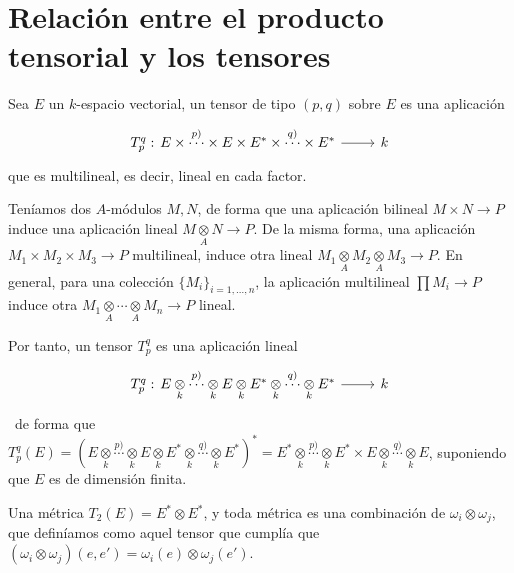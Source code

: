 \section{Relaci\'on entre el producto tensorial y los tensores}
Sea $E$ un $k$-espacio vectorial, un tensor de tipo $(p,q)$ sobre $E$ es una aplicaci\'on
$$\bt T^q_p : &[-10mm] E \times \overset{p)}{\cdots} \times E \times E^* \times \overset{q)}{\cdots} \times E^* \arrow{r} & k\et$$
que es multilineal, es decir, lineal en cada factor.

Ten\'iamos dos $A$-m\'odulos $M,N$, de forma que una aplicaci\'on bilineal $M \times N \longrightarrow P$ induce una aplicaci\'on lineal $M \underset{A}{\otimes} N  \longrightarrow P$. De la misma forma, una aplicaci\'on $M_1\times M_2 \times M_3 \longrightarrow P$ multilineal, induce otra lineal $M_1 \underset{A}{\otimes} M_2 \underset{A}{\otimes} M_3 \longrightarrow P$. En general, para una colecci\'on $\{M_i\}_{i=1, \ldots, n}$, la aplicaci\'on multilineal $\prod M_i \longrightarrow P$ induce otra $M_1 \underset{A}{\otimes} \cdots \underset{A}{\otimes} M_n \longrightarrow P$ lineal. 

Por tanto, un tensor $T_p^q$ es una aplicaci\'on lineal 
$$\bt T^q_p : &[-10mm] E \underset{k}{\otimes}\overset{p)}{\cdots} \underset{k}{\otimes}E \underset{k}{\otimes}E^* \underset{k}{\otimes}\overset{q)}{\cdots} \underset{k}{\otimes}E^* \arrow{r} & k\et$$\
de forma que $T_p^q(E) = ( E \underset{k}{\otimes}\overset{p)}{\cdots} \underset{k}{\otimes}E \underset{k}{\otimes} E^* \underset{k}{\otimes}\overset{q)}{\cdots} \underset{k}{\otimes}E^* )^* =E^* \underset{k}{\otimes}\overset{p)}{\cdots} \underset{k}{\otimes}E^* \times E \underset{k}{\otimes}\overset{q)}{\cdots} \underset{k}{\otimes}E $, suponiendo que $E$ es de dimensi\'on finita. 

\begin{ejem}
    Una m\'etrica $T_2(E) = E^* \otimes E^*$, y toda m\'etrica es una combinaci\'on de $\omega_i \otimes \omega_j$, que defin\'iamos como aquel tensor que cumpl\'ia que $(\omega_i \otimes \omega_j)(e,e') =\omega_i(e) \otimes \omega_j(e')$. 
\end{ejem}

